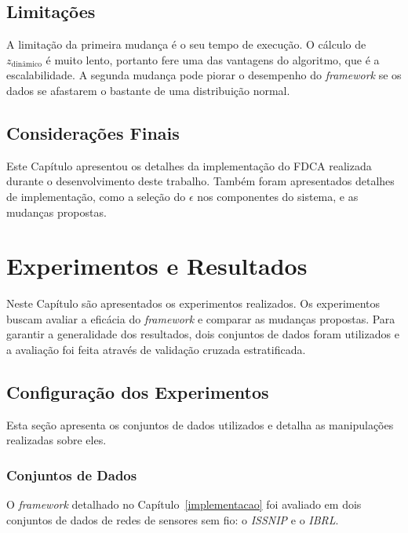 \documentclass[cic,tc]{iiufrgs}
\begin{document}
\section{Limitações}
A limitação da primeira mudança é o seu tempo de execução. O cálculo de $z_{\textrm{dinâmico}}$ é muito lento, portanto fere uma das vantagens do algoritmo, que é a escalabilidade. A segunda mudança pode piorar o desempenho do \textit{framework} se os dados se afastarem o bastante de uma distribuição normal.

\section{Considerações Finais}
Este Capítulo apresentou os detalhes da implementação do FDCA realizada durante o desenvolvimento deste trabalho. Também foram apresentados detalhes de implementação, como a seleção do $\epsilon$ nos componentes do sistema, e as mudanças propostas.

\chapter{Experimentos e Resultados}
\label{experimentos}
Neste Capítulo são apresentados os experimentos realizados. Os experimentos buscam avaliar a eficácia do \textit{framework} e comparar as mudanças propostas. Para garantir a generalidade dos resultados, dois conjuntos de dados foram utilizados e a avaliação foi feita através de validação cruzada estratificada.

\section{Configuração dos Experimentos}
Esta seção apresenta os conjuntos de dados utilizados e detalha as manipulações realizadas sobre eles. 

\subsection{Conjuntos de Dados}
O \textit{framework} detalhado no Capítulo~\ref{implementacao} foi avaliado em dois conjuntos de dados de redes de sensores sem fio: o \textit{ISSNIP} e o \textit{IBRL}.
\end{document}
